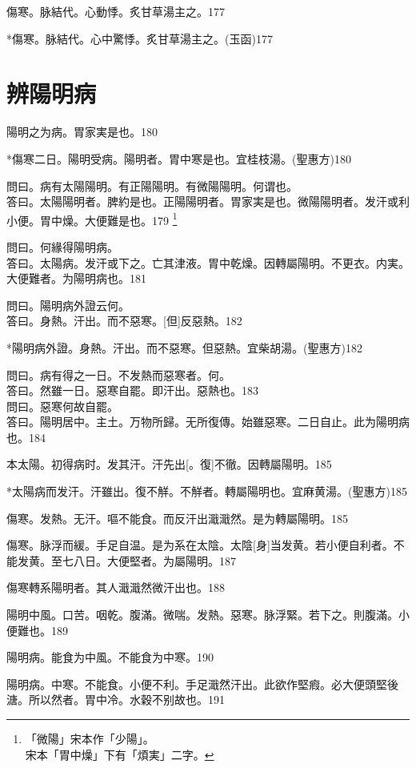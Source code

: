 \documentclass[12pt,twoside,UTF8,b5paper]{ctexbook}
\begin{document}
傷寒。脉結代。心動悸。炙甘草湯主之。177

*傷寒。脉結代。心中驚悸。炙甘草湯主之。(玉函)177

\chapter{辨陽明病}

陽明之为病。胃家実是也。180

*傷寒二日。陽明受病。陽明者。胃中寒是也。宜桂枝湯。(聖惠方)180

問曰。病有太陽陽明。有正陽陽明。有微陽陽明。何谓也。\\
答曰。太陽陽明者。脾約是也。正陽陽明者。胃家実是也。微陽陽明者。发汗或利小便。胃中燥。大便難是也。179
	\footnote{「微陽」宋本作「少陽」。\\宋本「胃中燥」下有「煩実」二字。}

問曰。何緣得陽明病。\\
答曰。太陽病。发汗或下之。亡其津液。胃中乾燥。因轉屬陽明。不更衣。内実。大便難者。为陽明病也。181

問曰。陽明病外證云何。\\
答曰。身熱。汗出。而不惡寒。[但]反惡熱。182

*陽明病外證。身熱。汗出。而不惡寒。但惡熱。宜柴胡湯。(聖惠方)182

問曰。病有得之一日。不发熱而惡寒者。何。\\
答曰。然雖一日。惡寒自罷。即汗出。惡熱也。183\\
問曰。惡寒何故自罷。\\
答曰。陽明居中。主土。万物所歸。无所復傳。始雖惡寒。二日自止。此为陽明病也。184

本太陽。初得病时。发其汗。汗先出[。復]不徹。因轉屬陽明。185

*太陽病而发汗。汗雖出。復不觧。不觧者。轉屬陽明也。宜麻黄湯。(聖惠方)185

傷寒。发熱。无汗。嘔不能食。而反汗出濈濈然。是为轉屬陽明。185

傷寒。脉浮而緩。手足自温。是为系在太陰。太陰[身]当发黄。若小便自利者。不能发黄。至七八日。大便堅者。为屬陽明。187

傷寒轉系陽明者。其人濈濈然微汗出也。188

陽明中風。口苦。咽乾。腹滿。微喘。发熱。惡寒。脉浮緊。若下之。則腹滿。小便難也。189

陽明病。能食为中風。不能食为中寒。190

陽明病。中寒。不能食。小便不利。手足濈然汗出。此欲作堅瘕。必大便頭堅後溏。所以然者。胃中冷。水穀不别故也。191
\end{document}
